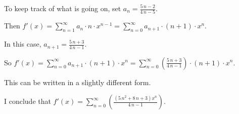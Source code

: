 \documentclass{ximera}
\begin{document}
\begin{question}
\begin{solution}
\begin{hint}
    \end{hint}
    \begin{hint}
      To keep track of what is going on, set \(a_{n} = \displaystyle\frac{5 \, n - 2}{4 \, n - 5}\).
    \end{hint}
    \begin{hint}
      Then \(f'(x) = \displaystyle\sum_{n=1}^\infty a_{n} \cdot n \cdot x^{n-1} =  \displaystyle\sum_{n=0}^\infty a_{n+1} \cdot \left(n+1\right) \cdot x^{n}\).
    \end{hint}
    \begin{hint}
      In this case, \(a_{n+1} = \displaystyle\frac{5 \, n + 3}{4 \, n - 1}\).
    \end{hint}
    \begin{hint}
      So \(f'(x) = \displaystyle\sum_{n=0}^\infty a_{n+1} \cdot \left(n+1\right) \cdot x^{n} = \displaystyle\sum_{n=0}^\infty \left( \displaystyle\frac{5 \, n + 3}{4 \, n - 1} \right) \cdot \left(n+1\right) \cdot x^{n}\).
    \end{hint}
    \begin{hint}
      This can be written in a slightly different form.
    \end{hint}
    \begin{hint}
      I conclude that \(f'(x) = \displaystyle\sum_{n=0}^\infty \left( \displaystyle\frac{ {\left(5 \, n^{2} + 8 \, n + 3\right)} x^{n} }{4 \, n - 1} \right) \).
    \end{hint}

    
    \begin{multiple-choice}
    \end{multiple-choice}

  \end{solution}
\end{question}
\end{document}
